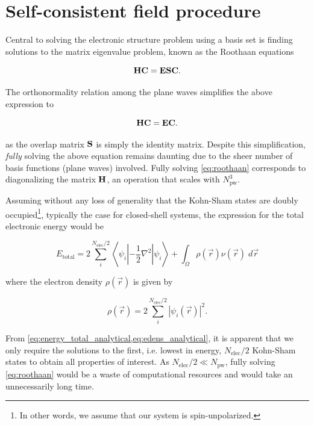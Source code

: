 %
%
%
\section{Self-consistent field procedure}

Central to solving the electronic structure problem using a basis set is finding solutions to the matrix eigenvalue problem, known as the Roothaan equations

\begin{equation}
    \mathbf{H}\mathbf{C} = \mathbf{E}\mathbf{S}\mathbf{C}.
\end{equation}

The orthonormality relation among the plane waves simplifies the above expression to

\begin{equation}
    \mathbf{H}\mathbf{C} = \mathbf{E}\mathbf{C}.
    \label{eq:roothaan}
\end{equation}

as the overlap matrix $\mathbf{S}$ is simply the identity matrix. Despite this simplification, \textit{fully} solving the above equation remains daunting due to the sheer number of basis functions (plane waves) involved. Fully solving \cref{eq:roothaan} corresponds to diagonalizing the matrix $\mathbf{H}$, an operation that scales with $N_{\text{pw}}^{3}$. 

Assuming without any loss of generality that the Kohn-Sham states are doubly occupied\footnote{In other words, we assume that our system is spin-unpolarized.}, typically the case for closed-shell systems, the expression for the total electronic energy would be

\begin{equation}
    E_{\text{total}} = 2\sum_{i}^{N_{\text{elec}}/2} \left< \psi_{i} \left|-\frac{1}{2} \nabla^{2} \right| \psi_{i} \right> + \int_{\Omega} \rho(\vec{r}) \nu(\vec{r}) \; d\vec{r}
    \label{eq:energy_total_analytical}
\end{equation}

where the electron density $\rho(\vec{r})$ is given by

\begin{equation}
    \rho(\vec{r}) = 2\sum_{i}^{N_{\text{elec}}/2} |\psi_{i}(\vec{r})|^{2}.
    \label{eq:edens_analytical}
\end{equation}

From \cref{eq:energy_total_analytical,eq:edens_analytical}, it is apparent that we only require the solutions to the first, i.e. lowest in energy, $N_{\text{elec}}/2$ Kohn-Sham states to obtain all properties of interest. As $N_{\text{elec}}/2 \ll N_{\textrm{pw}}$, fully solving \cref{eq:roothaan} would be a waste of computational resources and would take an unnecessarily long time.

